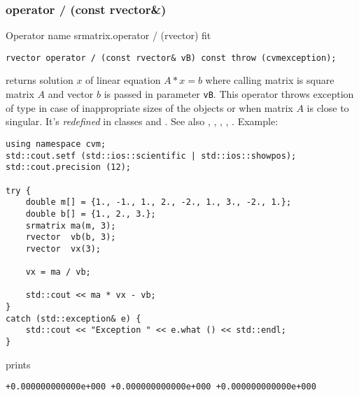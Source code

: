 \subsubsection{operator / (const rvector\&)}
Operator%
\pdfdest name {srmatrix.operator / (rvector)} fit
\begin{verbatim}
rvector operator / (const rvector& vB) const throw (cvmexception);
\end{verbatim}
returns solution $x$ of linear equation
$A*x=b$ where calling matrix is square matrix $A$
and vector $b$ is passed in parameter \verb"vB".
This operator throws exception 
of type 
in case of inappropriate sizes
of the objects or when  matrix $A$ is close to singular.
It's \emph{redefined} in classes  and .
See also , 
, 
, 
, .
Example:
\begin{Verbatim}
using namespace cvm;
std::cout.setf (std::ios::scientific | std::ios::showpos);
std::cout.precision (12);

try {
    double m[] = {1., -1., 1., 2., -2., 1., 3., -2., 1.};
    double b[] = {1., 2., 3.};
    srmatrix ma(m, 3);
    rvector  vb(b, 3);
    rvector  vx(3);

    vx = ma / vb;

    std::cout << ma * vx - vb;
}
catch (std::exception& e) {
    std::cout << "Exception " << e.what () << std::endl;
}
\end{Verbatim}
prints
\begin{Verbatim}
+0.000000000000e+000 +0.000000000000e+000 +0.000000000000e+000
\end{Verbatim}
\newpage




